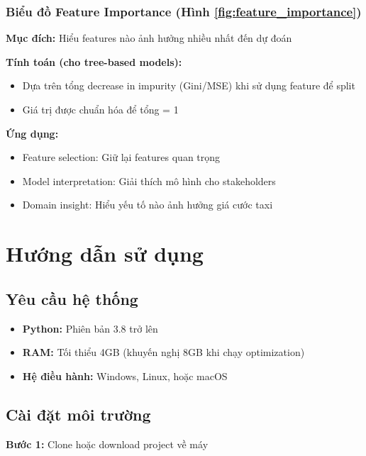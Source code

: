 \documentclass[12pt,a4paper]{article}
\begin{document}
\subsubsection{Biểu đồ Feature Importance (Hình \ref{fig:feature_importance})}

\textbf{Mục đích:} Hiểu features nào ảnh hưởng nhiều nhất đến dự đoán

\textbf{Tính toán (cho tree-based models):}
\begin{itemize}
    \item Dựa trên tổng decrease in impurity (Gini/MSE) khi sử dụng feature để split
    \item Giá trị được chuẩn hóa để tổng = 1
\end{itemize}

\textbf{Ứng dụng:}
\begin{itemize}
    \item Feature selection: Giữ lại features quan trọng
    \item Model interpretation: Giải thích mô hình cho stakeholders
    \item Domain insight: Hiểu yếu tố nào ảnh hưởng giá cước taxi
\end{itemize}

\section{Hướng dẫn sử dụng}

\subsection{Yêu cầu hệ thống}

\begin{itemize}
    \item \textbf{Python:} Phiên bản 3.8 trở lên
    \item \textbf{RAM:} Tối thiểu 4GB (khuyến nghị 8GB khi chạy optimization)
    \item \textbf{Hệ điều hành:} Windows, Linux, hoặc macOS
\end{itemize}

\subsection{Cài đặt môi trường}

\textbf{Bước 1:} Clone hoặc download project về máy
\end{document}
